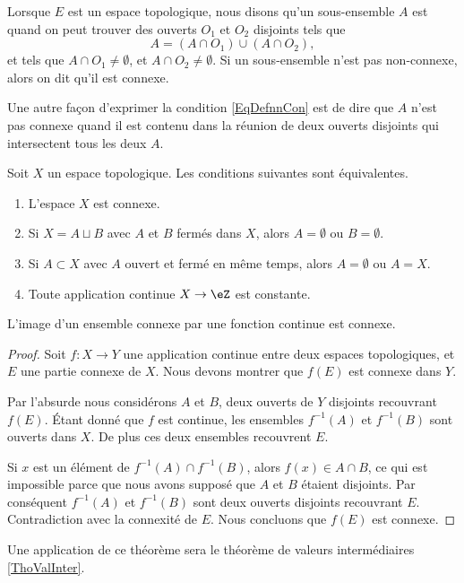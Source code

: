 \begin{definition}
 Lorsque $E$ est un espace topologique, nous disons qu'un sous-ensemble $A$ est  quand on peut trouver des ouverts $O_1$ et $O_2$ disjoints tels que
\begin{equation}    \label{EqDefnnCon}
  A=(A\cap O_1)\cup (A\cap O_2),
\end{equation}
et tels que $A\cap O_1\neq\emptyset$, et $A\cap O_2\neq\emptyset$.
Si un sous-ensemble n'est pas non-connexe, alors on dit qu'il est connexe.
\end{definition}
Une autre façon d'exprimer la condition \eqref{EqDefnnCon} est de dire que $A$ n'est pas connexe quand il est contenu dans la réunion de deux ouverts disjoints qui intersectent tous les deux $A$.

\begin{proposition} \label{PropHSjJcIr}
    Soit \( X\) un espace topologique. Les conditions suivantes sont équivalentes.
    \begin{enumerate}
        \item
            L'espace \( X\) est connexe.
        \item
            Si \( X=A\sqcup B\) avec \( A\) et \( B\) fermés dans \( X\), alors \( A=\emptyset\) ou \( B=\emptyset\).
        \item
            Si \( A\subset X\) avec \( A\) ouvert et fermé en même temps, alors \( A=\emptyset\) ou \( A=X\).
        \item
            Toute application continue \( X\to \eZ\) est constante.
    \end{enumerate}
\end{proposition}

\begin{proposition}\label{PropGWMVzqb}
    L'image d'un ensemble connexe par une fonction continue est connexe.
\end{proposition}

\begin{proof}
    Soit \( f\colon X\to Y\) une application continue entre deux espaces topologiques, et \( E\) une partie connexe de \( X\). Nous devons montrer que \( f(E)\) est connexe dans \( Y\).

    Par l'absurde nous considérons \( A\) et \( B\), deux ouverts de \( Y\) disjoints recouvrant \( f(E)\). Étant donné que \( f\) est continue, les ensembles \( f^{-1}(A)\) et \( f^{-1}(B)\) sont ouverts dans \( X\). De plus ces deux ensembles recouvrent \( E\).

    Si \( x\) est un élément de \( f^{-1}(A)\cap f^{-1}(B)\), alors \( f(x)\in A\cap B\), ce qui est impossible parce que nous avons supposé que \( A\) et \( B\) étaient disjoints. Par conséquent \( f^{-1}(A)\) et \( f^{-1}(B)\) sont deux ouverts disjoints recouvrant \( E\). Contradiction avec la connexité de \( E\). Nous concluons que \( f(E)\) est connexe.
\end{proof}
Une application de ce théorème sera le théorème de valeurs intermédiaires \ref{ThoValInter}.

